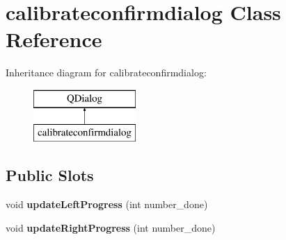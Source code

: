 \hypertarget{classcalibrateconfirmdialog}{}\section{calibrateconfirmdialog Class Reference}
\label{classcalibrateconfirmdialog}
Inheritance diagram for calibrateconfirmdialog\+:\begin{figure}[H]
\begin{center}
\leavevmode
\includegraphics[height=2.000000cm]{classcalibrateconfirmdialog}
\end{center}
\end{figure}
\subsection*{Public Slots}
\begin{DoxyCompactItemize}
\item 
\hypertarget{classcalibrateconfirmdialog_a8579c47f6d8634ddb6acde470894aa7d}{}void {\bfseries update\+Left\+Progress} (int number\+\_\+done)\label{classcalibrateconfirmdialog_a8579c47f6d8634ddb6acde470894aa7d}

\item 
\hypertarget{classcalibrateconfirmdialog_a1f5748596aa11125e1ce010df142aa2c}{}void {\bfseries update\+Right\+Progress} (int number\+\_\+done)\label{classcalibrateconfirmdialog_a1f5748596aa11125e1ce010df142aa2c}

\end{DoxyCompactItemize}
